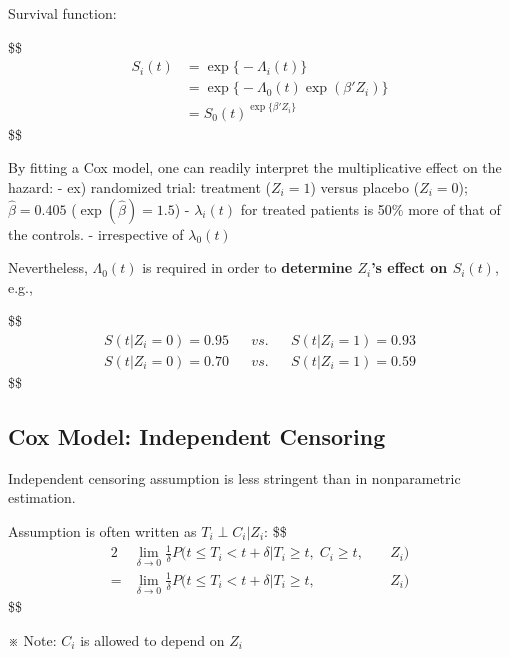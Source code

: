 \documentclass[
]{book}
\theoremstyle{definition}
\theoremstyle{definition}
\theoremstyle{definition}
\theoremstyle{definition}
\theoremstyle{remark}
\begin{document}
Survival function:

\$\$
\begin{align}
S_i (t) &= \exp \Big \{ -\Lambda_i (t) \Big\}
\\
&= \exp \Big \{ -\Lambda_0 (t) \exp(\beta ' Z_i)\Big\}
\\
&= S_0(t)^{\exp \Big \{ \beta'Z_i \Big\}}


\end{align}
\$\$

By fitting a Cox model, one can readily interpret the multiplicative effect on the hazard:
- ex) randomized trial: treatment (\(Z_i=1\)) versus placebo (\(Z_i=0\)); \(\hat \beta = 0.405\) (\(\exp(\hat \beta)=1.5\))
- \(\lambda_i(t)\) for treated patients is 50\% more of that of the controls.
- irrespective of \(\lambda_0(t)\)

Nevertheless, \(\Lambda_0(t)\) is required in order to \textbf{determine \(Z_i\)'s effect on \(S_i(t)\)}, e.g.,

\$\$
\begin{align}

S(t \Big | Z_i = 0) = 0.95 && vs. && S(t \Big | Z_i = 1) = 0.93


\\
S(t \Big | Z_i = 0) = 0.70 && vs. && S(t \Big | Z_i = 1) = 0.59



\end{align}
\$\$

\hypertarget{cox-model-independent-censoring}{%
\subsection{Cox Model: Independent Censoring}\label{cox-model-independent-censoring}}

Independent censoring assumption is less stringent than in nonparametric estimation.

Assumption is often written as \(T_i \perp C_i \Big \vert Z_i\):
\$\$
\begin{alignat}{2}

&\lim_{\delta \rightarrow 0} \frac{1}{\delta} P(t \le T_i < t+ \delta \Big | T_i \ge t , \; C_i \ge t , &&\; Z_i)
\\
= &\lim_{\delta \rightarrow 0} \frac{1}{\delta} P(t \le T_i < t+ \delta \Big | T_i \ge t ,  &&\; Z_i)

\end{alignat}
\$\$

※ Note: \(C_i\) is allowed to depend on \(Z_i\)
\end{document}
